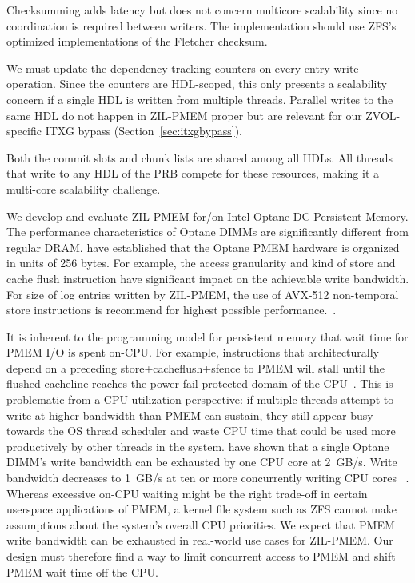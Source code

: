 \documentclass[12pt,a4paper,twoside]{book}
\begin{document}
\begin{description}[noitemsep]
    \item[Checksumming] Checksumming adds latency but does not concern multicore scalability since no coordination is required between writers.
        The implementation should use ZFS's optimized implementations of the Fletcher checksum.
    \item[Dependency Tracking Counters] We must update the dependency-tracking counters on every entry write operation.
        Since the counters are HDL-scoped, this only presents a scalability concern if a single HDL is written from multiple threads.
        Parallel writes to the same HDL do not happen in ZIL-PMEM proper but are relevant for our ZVOL-specific ITXG bypass (Section~\ref{sec:itxgbypass}).
    \item[Commit Slot Aquisition \& Chunk Replacement]
        Both the commit slots and chunk lists are shared among all HDLs.
        All threads that write to any HDL of the PRB compete for these resources, making it a multi-core scalability challenge.
    \item[Optane Characteristics] We develop and evaluate ZIL-PMEM for/on Intel Optane DC Persistent Memory.
        The performance characteristics of Optane DIMMs are significantly different from regular DRAM.
        \citeauthor{yangEmpiricalGuideBehavior2020} have established that the Optane PMEM hardware is organized in units of 256 bytes.
        For example, the access granularity and kind of store and cache flush instruction have significant impact on the achievable write bandwidth.
        For size of log entries written by ZIL-PMEM, the use of  AVX-512 non-temporal store instructions is recommend for highest possible performance.~\cite{yangEmpiricalGuideBehavior2020}.
    \item[PMEM Bandwidth Limits \& Multicore Scalability]
        It is inherent to the programming model for persistent memory that wait time for PMEM I/O is spent on-CPU.
        For example, instructions that architecturally depend on a preceding store+cacheflush+sfence to PMEM will stall until the flushed cacheline reaches the power-fail protected domain of the CPU~\cite{Scargall2020}.
        This is problematic from a CPU utilization perspective:
        if multiple threads attempt to write at higher bandwidth than PMEM can sustain, they still appear busy towards the OS thread scheduler and waste CPU time that could be used more productively by other threads in the system.
        \citeauthor{yangEmpiricalGuideBehavior2020} have shown that a single Optane DIMM's write bandwidth can be exhausted by one CPU core at 2~GB/s.
        Write bandwidth decreases to 1~GB/s at ten or more concurrently writing CPU cores ~\cite{yangEmpiricalGuideBehavior2020}.
        Whereas excessive on-CPU waiting might be the right trade-off in certain userspace applications of PMEM, a kernel file system such as ZFS cannot make assumptions about the system's overall CPU priorities.
        We expect that PMEM write bandwidth can be exhausted in real-world use cases for ZIL-PMEM.
        Our design must therefore find a way to limit concurrent access to PMEM and shift PMEM wait time off the CPU.
\end{description}
\end{document}
